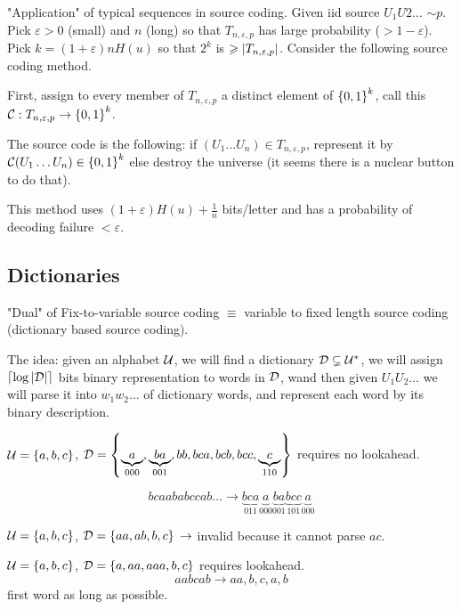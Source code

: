 \bigskip

"Application" of typical sequences in source coding. Given iid source $U_1U2\ldots$ $\sim p$. Pick $\varepsilon > 0$ (small) and $n$ (long) so that $T_{n,\varepsilon, p}$ has large probability ($>1-\varepsilon$). Pick $k = (1+\varepsilon)nH(u)$ so that $2^k$ is $\geqslant \left\lvert T_{n,\varepsilon, p}\right\rvert$. Consider the following source coding method.

First, assign to every member of $T_{n,\varepsilon,p}$ a distinct element of $\left\{ 0,1 \right\}^k$, call this $\mathcal{C} : T_{n,\varepsilon,p} \to \left\{ 0,1 \right\}^k$.

The source code is the following: if $(U_1\ldots U_n)\in T_{n,\varepsilon,p}$, represent it by $\mathcal{C}(U_1\ldots U_n)\in\left\{ 0,1 \right\}^k$ else destroy the universe (it seems there is a nuclear button to do that).

This method uses $(1+\varepsilon) H(u) + \frac{1}{n}$ bits/letter and has a probability of decoding failure $< \varepsilon$.


\subsection{Dictionaries}

"Dual" of Fix-to-variable source coding $\equiv$ variable to fixed length source coding (dictionary based source coding).

The idea: given an alphabet $\mathcal{U}$, we will find a dictionary $\mathcal{D} \subsetneq \mathcal{U}^*$, we will assign $\left\lceil \log\left\lvert\mathcal{D}\right\rvert \right\rceil$ bits binary representation to words in $\mathcal{D}$, wand then given $U_1U_2\ldots$ we will parse it into $w_1w_2\ldots$ of dictionary words, and represent each word by its binary description.

\begin{example}\label{codes_fixed_to_fixed:ex:1}
    $\mathcal{U} = \left\{ a,b,c \right\}$, $\mathcal{D} = \left\{ \underbrace{a}_{000},\underbrace{ba}_{001},bb,bca,bcb,bcc,\underbrace{c}_{110} \right\}$ requires no lookahead.
    
    \[
        bcaababccab\ldots \to \underbrace{bca}_{011} \underbrace{a}_{000} \underbrace{ba}_{001}\underbrace{bcc}_{101}\underbrace{a}_{000}
    \]
\end{example}

\begin{example}\label{codes_fixed_to_fixed:ex:2}
    $\mathcal{U} = \left\{ a,b,c \right\}$, $\mathcal{D}=\left\{ aa,ab,b,c \right\}$ $\rightarrow$ invalid because it cannot parse $ac$.
\end{example}

\begin{example}\label{codes_fixed_to_fixed:ex:3}
    $\mathcal{U} = \left\{ a,b,c \right\}$, $\mathcal{D}=\left\{ a,aa,aaa,b,c \right\}$ requires lookahead.
    \[
        aabcab \to aa,b,c,a,b    
    \]
    first word as long as possible.
\end{example}

